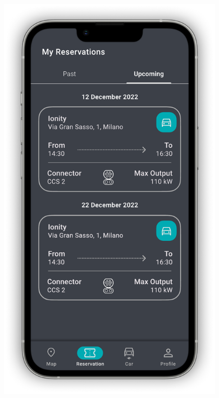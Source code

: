 \begin{figure}[H]
{        \includegraphics[scale=0.32,page=1]{src/mockups/reservations.pdf}
    }
    \subfloat[Profile]{
}
\end{figure}
